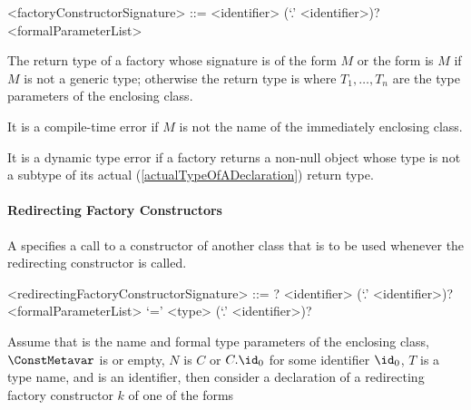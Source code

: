 \documentclass[makeidx]{article}
\begin{document}
\begin{grammar}
<factoryConstructorSignature> ::= \gnewline{}
  \FACTORY{} <identifier> (`.' <identifier>)? <formalParameterList>
\end{grammar}


\LMHash{}%
The return type of a factory whose signature is of the form \FACTORY{} $M$ or the form \FACTORY{}  is $M$ if $M$ is not a generic type;
otherwise the return type is  where $T_1, \ldots, T_n$ are the type parameters of the enclosing class.

\LMHash{}%
It is a compile-time error if $M$ is not the name of the immediately enclosing class.

\LMHash{}%
It is a dynamic type error if a factory returns a non-null object
whose type is not a subtype of its actual
(\ref{actualTypeOfADeclaration})
return type.




\paragraph{Redirecting Factory Constructors}

\LMHash{}%
A 
specifies a call to a constructor of another class that is to be used
whenever the redirecting constructor is called.

\begin{grammar}
<redirectingFactoryConstructorSignature> ::= \gnewline{}
  \CONST{}? \FACTORY{} <identifier> (`.' <identifier>)? <formalParameterList> `='
  \gnewline{} <type> (`.' <identifier>)?
\end{grammar}

Assume that
is the name and formal type parameters of the enclosing class,
$\ConstMetavar$ is \CONST{} or empty,
$N$ is $C$ or $C.\id_0$ for some identifier $\id_0$,
$T$ is a type name, and \id{} is an identifier,
then consider a declaration of a redirecting factory constructor $k$ of one of the forms
\end{document}
